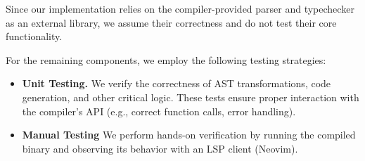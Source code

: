 Since our implementation relies on the compiler-provided parser and typechecker
as an external library, we assume their correctness and do not test their core
functionality.  

For the remaining components, we employ the following testing strategies:

\begin{itemize}
  \item \textbf{Unit Testing.} We verify the correctness of AST transformations,
  code generation, and other critical logic. These tests ensure proper
  interaction with the compiler's API (e.g., correct function calls, error
  handling).  
  
  \item \textbf{Manual Testing} We perform hands-on verification by running the
  compiled binary and observing its behavior with an LSP client (Neovim). 

\end{itemize}
